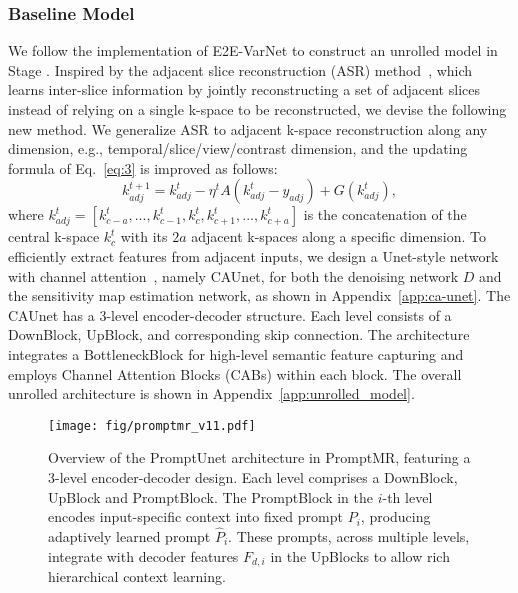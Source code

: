 \documentclass[runningheads]{llncs}
\newcommand{\RNum}[1]{\uppercase\expandafter{\romannumeral #1\relax}}
\begin{document}
\subsubsection{Baseline Model}
We follow the implementation of E2E-VarNet \cite{sriram2020end} to construct an unrolled model in Stage \RNum{1}.
Inspired by the adjacent slice reconstruction (ASR) method~\cite{fabian2022humus}, which learns inter-slice information by jointly reconstructing a set of adjacent slices instead of relying on a single k-space to be reconstructed, we devise the following new method. We generalize ASR to adjacent k-space reconstruction along any dimension, e.g., temporal/slice/view/contrast dimension, and the updating formula of Eq.~\ref{eq:3} is improved as follows:
\begin{equation}
\label{eq:5}
k^{t+1}_{adj}=k^t_{adj}-\eta^tA(k^t_{adj}-y_{adj})+G(k^t_{adj}),
\end{equation}
where $k^t_{adj}=[k^t_{c-a}, ..., k^t_{c-1}, k^t_{c}, k^t_{c+1}, ..., k^t_{c+a}]$ is the concatenation of the central k-space $k^t_{c}$ with its $2a$ adjacent k-spaces along a specific dimension. 
To efficiently extract features from adjacent inputs, we design a Unet-style network~\cite{ronneberger2015u} with channel attention~\cite{hu2018squeeze,huang2019mri}, namely CAUnet,  for both the denoising network $D$ and the sensitivity map estimation network, as shown in Appendix~\ref{app:ca-unet}. The CAUnet has a 3-level encoder-decoder structure. Each level consists of a DownBlock, UpBlock, and corresponding skip connection. The architecture integrates a BottleneckBlock for high-level semantic feature capturing and employs Channel Attention Blocks (CABs) within each block. The overall unrolled architecture is shown in Appendix~\ref{app:unrolled_model}.



\begin{figure*}[t!]
\centering
\texttt{[image: fig/promptmr\_v11.pdf]}
\caption{Overview of the PromptUnet architecture in PromptMR, featuring a 3-level encoder-decoder design. Each level comprises a DownBlock, UpBlock and PromptBlock. The PromptBlock in the $i$-th level encodes input-specific context into fixed prompt $P_i$, producing adaptively learned prompt $\hat{P}_i$. These prompts, across multiple levels, integrate with decoder features $F_{d,i}$ in the UpBlocks to allow rich hierarchical context learning.}
\label{fig:promptmr}
\end{figure*}
\end{document}
